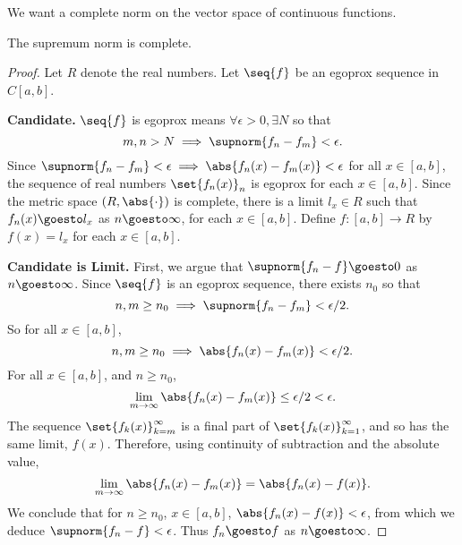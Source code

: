 

We want a complete
norm on the vector
space of continuous
functions.


\begin{prop}
The supremum norm
is complete.

\begin{proof}
Let $R$ denote the real numbers.
Let $\seq{f}$ be an egoprox sequence
in $C[a, b]$.

\textbf{Candidate.}
$\seq{f}$ is egoprox means
$\forall \epsilon > 0, \exists N$
so that
\[
  m, n > N \implies \supnorm{f_n - f_m} < \epsilon.
\]
Since $\supnorm{f_n - f_m} < \epsilon \implies
\abs{f_n(x) - f_m(x)} < \epsilon$ for
all $x \in [a, b]$, the
sequence of real numbers $\set{f_n(x)}_n$
is egoprox for each $x \in [a, b]$.
Since the metric space $(R, \abs{\cdot})$
is complete, there is a limit $l_x \in R$
such that $f_n(x) \goesto l_x$ as
$n \goesto \infty$, for each $x \in [a, b]$.
Define $f: [a, b] \to R$
by $f(x) = l_x$ for each $x \in [a, b]$.

\textbf{Candidate is Limit.}
First, we argue that
$\supnorm{f_n - f} \goesto 0$
as $n \goesto \infty$.
Since $\seq{f}$ is an egoprox sequence,
there exists $n_0$ so that
\[
  n,m \geq n_0
  \implies
  \supnorm{f_n - f_m} < \epsilon/2.
\]
So for all $x \in [a, b]$,
\[
  n,m \geq n_0
  \implies
  \abs{f_n(x) - f_m(x)} < \epsilon/2.
\]
For all $x \in [a, b]$,
and $n \geq n_0$,
\[
  \lim_{m \to \infty} \abs{f_n(x) - f_m(x)}
  \leq \epsilon/2 < \epsilon.
\]
The sequence
$\set{f_k(x)}_{k = m}^{\infty}$
is a final part of
$\set{f_k(x)}_{k = 1}^{\infty}$,
and so has the same limit, $f(x)$.
Therefore, using continuity
of subtraction and the absolute
value,
\[
  \lim_{m \to \infty}
    \abs{f_n(x) - f_m(x)}
  =
  \abs{f_n(x) - f(x)}.
\]
We conclude that for
$n \geq n_0$,
$x \in [a, b]$,
$\abs{f_n(x) - f(x)} < \epsilon$,
from which we deduce
$\supnorm{f_n - f} < \epsilon$.
Thus $f_n \goesto f$
as $n \goesto \infty$.


\end{proof}
\end{prop}
